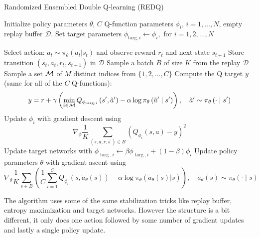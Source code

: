 \begin{algorithm}[H]
\caption{Randomized Ensembled Double Q-learning (REDQ)}
\begin{algorithmic}[1]
\State Initialize policy parameters $\theta$, $C$ Q-function parameters $\phi_{i}$, $i=1,\ldots,N$, empty replay buffer $\mathcal{D}$. Set target parameters $\phi_{\text {targ}, i} \leftarrow \phi_{i}, \text{ for } i =1, 2, \ldots, N$

\Repeat
    \State Select action: $a_{t} \sim \pi_{\theta}(a_{t} | s_{t})$ and observe reward $r_{t}$ and next state $s_{t+1}$
    \State Store transition $(s_{t}, a_{t}, r_{t}, s_{t+1})$ in $\mathcal{D}$
        \State Sample a batch $B$ of size $K$ from the replay $\mathcal{D}$
        \State Sample a set $\cal{M}$ of $M$ distinct indices from $\{1, 2, \ldots, C\}$
        \State Compute the Q target $y$ (same for all of the $C$ Q-functions):
        \[
        y=r+\gamma\left(\min _{i\in \cal{M}} Q_{\phi_{\text {targ},i}}\left(s^{\prime}, \tilde{a}^{\prime}\right)-\alpha \log \pi_{\theta}\left(\tilde{a}^{\prime} \mid s^{\prime}\right)\right),\quad \tilde{a}^{\prime} \sim \pi_{\theta}\left(\cdot \mid s^{\prime}\right)
        \]
            \State Update $\phi_i$ with gradient descent using
            \[
            \nabla_{\phi} \frac{1}{K} \sum_{\left(s, a, r, s^{\prime} \right) \in B}\left(Q_{\phi_{i}}(s, a)-y\right)^{2} 
            \]
            \State Update target networks with $\phi_{\operatorname{targ},i} \leftarrow \beta \phi_{\operatorname{targ},i}+(1-\beta) \phi_{i}$
        \EndFor
    \EndFor
    \State Update policy parameters $\theta$ with gradient ascent using
    \[
    \nabla_{\theta} \frac{1}{K} \sum_{s \in B}\left(\frac{1}{C}\sum_{i =1}^{C} Q_{\phi_{i}}\left(s, \tilde{a}_{\theta}(s)\right)-\alpha \log \pi_{\theta}\left(\tilde{a}_{\theta}(s) | s\right)\right),
    \quad \tilde{a}_{\theta}(s) \sim \pi_{\theta}(\cdot \mid s)
    \]
\end{algorithmic}
\end{algorithm}

The algorithm uses some of the same stabilization tricks like replay buffer, entropy maximization and target networks. However the structure is a bit different, it only does one action followed by some number of gradient updates and lastly a single policy update. 


